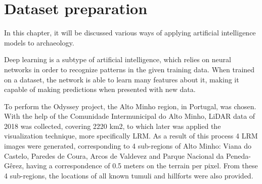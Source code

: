 
\chapter{Dataset preparation}

\begin{introduction}
In this chapter, it will be discussed various ways of applying artificial intelligence models to archaeology.
\end{introduction}





Deep learning is a subtype of artificial intelligence, which relies on neural networks in order to recognize patterns in the given training data. When trained on a dataset, the network is able to learn many features about it, making it capable of making predictions when presented with new data.



%
%

To perform the Odyssey project, the Alto Minho region, in Portugal, was chosen. With the help of the Comunidade Intermunicipal do Alto Minho\cite{comunidadeAltoMinho}, LiDAR data of 2018 was collected, covering 2220 km2, to which later was applied the visualization technique, more specifically LRM. As a result of this process 4 LRM images were generated, corresponding to 4 sub-regions of Alto Minho: Viana do Castelo, Paredes de Coura, Arcos de Valdevez and Parque Nacional da Peneda-Gêrez, having a correspondence of 0.5 meters on the terrain per pixel.
From these 4 sub-regions, the locations of all known tumuli and hillforts were also provided.

